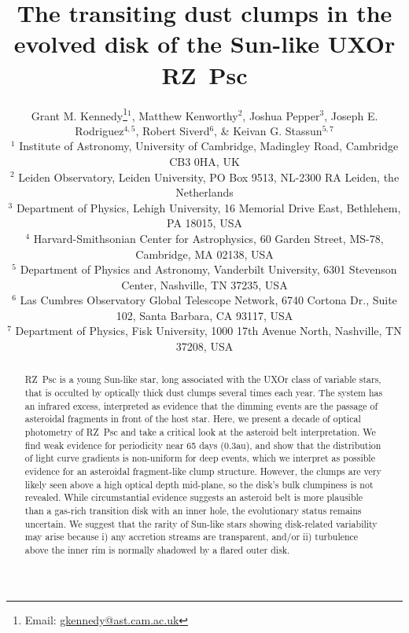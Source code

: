 \documentclass[useAMS,usenatbib,usegraphicx]{mn2e}
\begin{document}
\title[The transiting dust clumps of RZ~Psc]{The transiting dust clumps in the evolved
  disk of the Sun-like UXOr RZ~Psc}

\author[Grant M. Kennedy et al]{Grant M. Kennedy\thanks{Email:
    \href{mailto:gkennedy@ast.cam.ac.uk}{gkennedy@ast.cam.ac.uk}}$^1$,
  Matthew Kenworthy$^2$,
  Joshua Pepper$^3$, \newauthor
  Joseph E. Rodriguez$^{4,5}$, 
  Robert Siverd$^6$, \&
  Keivan G. Stassun$^{5,7}$ \\
  $^1$ Institute of Astronomy, University of Cambridge, Madingley Road, Cambridge CB3
  0HA, UK \\
  $^2$ Leiden Observatory, Leiden University, PO Box 9513, NL-2300 RA Leiden, the
  Netherlands \\
  $^3$ Department of Physics, Lehigh University, 16 Memorial Drive East, Bethlehem, PA
  18015, USA \\
  $^4$ Harvard-Smithsonian Center for Astrophysics, 60 Garden Street, MS-78, Cambridge, MA
  02138, USA \\
  $^5$ Department of Physics and Astronomy, Vanderbilt University, 6301 Stevenson Center,
  Nashville, TN 37235, USA \\
  $^6$ Las Cumbres Observatory Global Telescope Network, 6740 Cortona Dr., Suite 102, Santa
  Barbara, CA 93117, USA \\
  $^7$ Department of Physics, Fisk University, 1000 17th Avenue North, Nashville, TN
  37208, USA \\
}
\maketitle

\begin{abstract}
  RZ~Psc is a young Sun-like star, long associated with the UXOr class of variable stars,
  that is occulted by optically thick dust clumps several times each year. The system has
  an infrared excess, interpreted as evidence that the dimming events are the passage of
  asteroidal fragments in front of the host star. Here, we present a decade of optical
  photometry of RZ~Psc and take a critical look at the asteroid belt interpretation. We
  find weak evidence for periodicity near 65 days (0.3au), and show that the distribution
  of light curve gradients is non-uniform for deep events, which we interpret as possible
  evidence for an asteroidal fragment-like clump structure. However, the clumps are very
  likely seen above a high optical depth mid-plane, so the disk's bulk clumpiness is not
  revealed. While circumstantial evidence suggests an asteroid belt is more plausible
  than a gas-rich transition disk with an inner hole, the evolutionary status remains
  uncertain. We suggest that the rarity of Sun-like stars showing disk-related
  variability may arise because i) any accretion streams are transparent, and/or ii)
  turbulence above the inner rim is normally shadowed by a flared outer disk.
\end{abstract}
\end{document}
